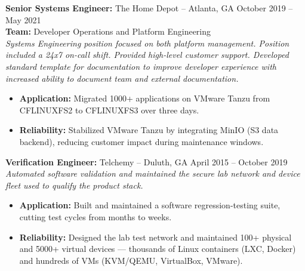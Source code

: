 \documentclass[11pt]{article}       %
\begin{document}
\begin{description}
\item\textbf{Senior Systems Engineer:} {The Home Depot} -- Atlanta, GA \hfill October 2019 -- May 2021 \\
\textbf{Team:} Developer Operations and Platform Engineering \\
\textit{Systems Engineering position focused on both platform management. Position included a 24x7 on-call shift. Provided high-level customer support. Developed standard template for documentation to improve developer experience with increased ability to document team and external documentation.} \\
\vspace{-6.5pt}
\begin{itemize}
  \item \textbf{Application:} Migrated 1000+ applications on VMware Tanzu from CFLINUXFS2 to CFLINUXFS3 over three days.
  \item \textbf{Reliability:} Stabilized VMware Tanzu by integrating MinIO (S3 data backend), reducing customer impact during maintenance windows.
\end{itemize}
\end{description}

\begin{description}
\item\textbf{Verification Engineer:} {Telchemy} -- Duluth, GA \hfill April 2015 -- October 2019 \\
\textit{Automated software validation and maintained the secure lab network and device fleet used to qualify the product stack.} \\
\vspace{-6.5pt}
\begin{itemize}
  \item \textbf{Application:} Built and maintained a software regression-testing suite, cutting test cycles from months to weeks.
  \item \textbf{Reliability:} Designed the lab test network and maintained 100+ physical and 5000+ virtual devices — thousands of Linux containers (LXC, Docker) and hundreds of VMs (KVM/QEMU, VirtualBox, VMware).
\end{itemize}
\end{description}

\vspace{-18.5pt}
\end{document}
